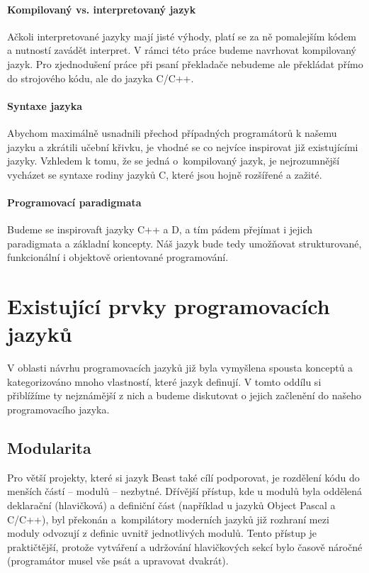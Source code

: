 \paragraph{Kompilovaný vs. interpretovaný jazyk}
Ačkoli interpretované jazyky mají jisté výhody, platí se za ně pomalejším kódem a nutností zavádět interpret. V rámci této práce budeme navrhovat kompilovaný jazyk. Pro zjednodušení práce při psaní překladače nebudeme ale překládat přímo do strojového kódu, ale do jazyka C/C++.

\paragraph{Syntaxe jazyka}
Abychom maximálně usnadnili přechod případných programátorů k našemu jazyku a zkrátili učební křivku, je vhodné se co nejvíce inspirovat již existujícími jazyky. Vzhledem k tomu, že se jedná o~kompilovaný jazyk, je nejrozumnější vycházet se syntaxe rodiny jazyků C, které jsou hojně rozšířené a zažité.

\paragraph{Programovací paradigmata}
Budeme se inspirovaft jazyky C++ a D, a tím pádem přejímat i jejich paradigmata a základní koncepty. Náš jazyk bude tedy umožňovat strukturované, funkcionální i objektově orientované programování.

\section{Existující prvky programovacích jazyků}
V oblasti návrhu programovacích jazyků již byla vymyšlena spousta konceptů a kategorizováno mnoho vlastností, které jazyk definují. V tomto oddílu si přiblížíme ty nejznámější z nich a budeme diskutovat o jejich začlenění do našeho programovacího jazyka.

\subsection{Modularita}
Pro větší projekty, které si jazyk Beast také cílí podporovat, je rozdělení kódu do menších částí -- modulů -- nezbytné. Dřívější přístup, kde u modulů byla oddělená deklarační (hlavičková) a definiční část (například u jazyků Object Pascal a C/C++), byl překonán a~kompilátory moderních jazyků již rozhraní mezi moduly odvozují z definic uvnitř jednotlivých modulů. Tento přístup je praktičtější, protože vytváření a udržování hlavičkových sekcí bylo časově náročné (programátor musel vše psát a upravovat dvakrát).

